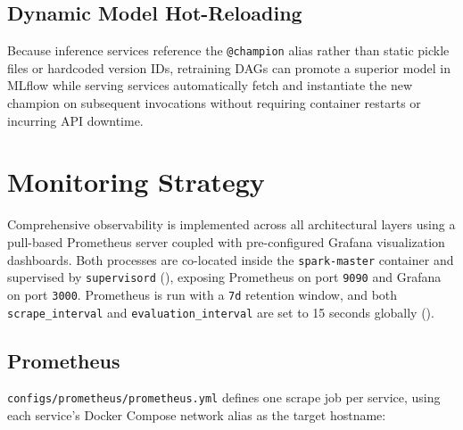 \documentclass[11pt,a4paper]{article}
\begin{document}
\subsection{Dynamic Model Hot-Reloading}
Because inference services reference the \texttt{@champion} alias rather than static pickle files or hardcoded version IDs, retraining DAGs can promote a superior model in MLflow while serving services automatically fetch and instantiate the new champion on subsequent invocations without requiring container restarts or incurring API downtime.

\section{Monitoring Strategy}

Comprehensive observability is implemented across all architectural layers using a pull-based Prometheus server coupled with pre-configured Grafana visualization dashboards. Both processes are co-located inside the \texttt{spark-master} container and supervised by \texttt{supervisord} (), exposing Prometheus on port \texttt{9090} and Grafana on port \texttt{3000}. Prometheus is run with a \texttt{7d} retention window, and both \texttt{scrape\_interval} and \texttt{evaluation\_interval} are set to 15 seconds globally ().

\subsection{Prometheus}

\texttt{configs/prometheus/prometheus.yml} defines one scrape job per service, using each service's Docker Compose network alias as the target hostname:
\end{document}

